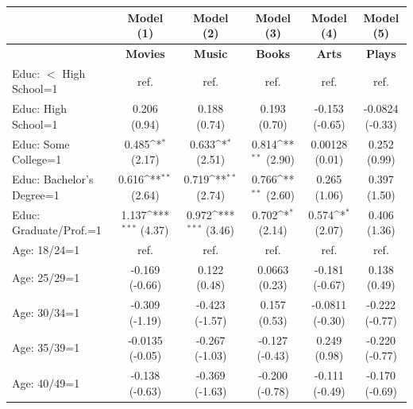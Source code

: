 \begin{landscape}
\begin{table}[here]
\def\sym#1{\ifmmode^{#1}\else\(^{#1}\)\fi}
\begin{tabular}{l*{5}{c}}
\hline
 &\multicolumn{1}{c}{Model (1)}&\multicolumn{1}{c}{Model (2)}&\multicolumn{1}{c}{Model (3)}&\multicolumn{1}{c}{Model (4)}&\multicolumn{1}{c}{Model (5)}\\
 \hline
 \hline
 &\multicolumn{1}{c}{\textbf{Movies}}&\multicolumn{1}{c}{\textbf{Music}}&\multicolumn{1}{c}{\textbf{Books}}&\multicolumn{1}{c}{\textbf{Arts}}&\multicolumn{1}{c}{\textbf{Plays}}\\


Educ: $<$ High School=1       &        ref.         &        ref.         &        ref.         &        ref.         &        ref.         \\
Educ: High School=1           &0.206 (0.94)         &0.188 (0.74)         &0.193 (0.70)         &-0.153 (-0.65)         &-0.0824 (-0.33)         \\
Educ: Some College=1          &0.485\sym{*} (2.17)         &0.633\sym{*} (2.51)         &0.814\sym{**} (2.90)         &0.00128 (0.01)         &0.252 (0.99)         \\
Educ: Bachelor's Degree=1     &0.616\sym{**} (2.64)         &0.719\sym{**} (2.74)         &0.766\sym{**} (2.60)         &0.265 (1.06)         &0.397 (1.50)         \\
Educ: Graduate/Prof.=1        &1.137\sym{***} (4.37)         &0.972\sym{***} (3.46)         &0.702\sym{*} (2.14)         &0.574\sym{*} (2.07)         &0.406 (1.36)         \\
Age: 18/24=1                  &        ref.         &        ref.         &        ref.         &        ref.         &        ref.         \\
Age: 25/29=1                  &-0.169 (-0.66)         &0.122 (0.48)         &0.0663 (0.23)         &-0.181 (-0.67)         &0.138 (0.49)         \\
Age: 30/34=1                  &-0.309 (-1.19)         &-0.423 (-1.57)         &0.157 (0.53)         &-0.0811 (-0.30)         &-0.222 (-0.77)         \\
Age: 35/39=1                  &-0.0135 (-0.05)         &-0.267 (-1.03)         &-0.127 (-0.43)         &0.249 (0.98)         &-0.220 (-0.77)         \\
Age: 40/49=1                  &-0.138 (-0.63)         &-0.369 (-1.63)         &-0.200 (-0.78)         &-0.111 (-0.49)         &-0.170 (-0.69)         \\

\end{tabular}
\end{table}
\end{landscape}
